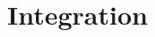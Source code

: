 \newpage

\section[Day 5: Integration]{ Integration }
























































